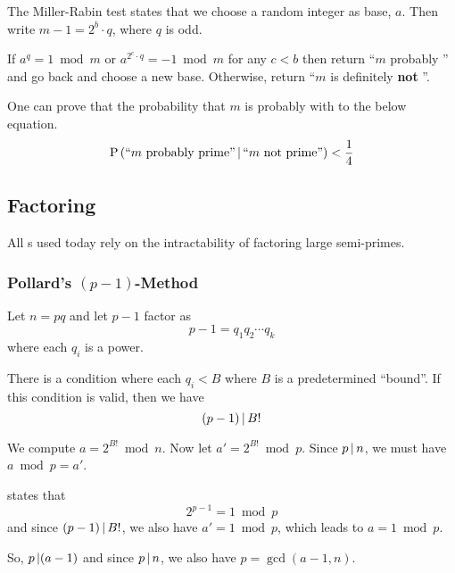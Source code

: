 \begin{theorem}\label{thm:Miller_Rabin_Test}
  The Miller-Rabin test states that we choose a random integer as base, $a$.
  Then write $m -1 = 2^{b} \cdot q$, where $q$ is odd.

  If $a^{q} = 1 \bmod m$ or $a^{2^{c} \cdot q} = -1 \bmod m$ for any $c < b$ then return ``$m$ probably '' and go back and choose a new base.
  Otherwise, return ``$m$ is definitely \textbf{not} ''.

  One can prove that the probability that $m$ is probably  with to the below equation.
  \begin{equation}\label{eq:Miller_Rabin_Test_Success_Probability}
    \operatorname{\operatorname{P}} \left( \text{``$m$ probably prime''} \operatorname{\vert} \text{``$m$ not prime''} \right) < \frac{1}{4}
  \end{equation}
\end{theorem}

\subsection{Factoring}\label{subsec:Factoring}
All s used today rely on the intractability of factoring large semi-primes.

\subsubsection{\texorpdfstring{Pollard's $(p-1)$-Method}{Pollard's Method}}\label{subsubsec:Pollards_Method}
\begin{theorem}\label{thm:Pollards_Method}
  Let $n = pq$ and let $p-1$ factor as
  \begin{equation*}
    p-1 = q_{1}q_{2} \cdots q_{k}
  \end{equation*}
  where each $q_{i}$ is a  power.

  There is a condition where each $q_{i} < B$ where $B$ is a predetermined ``bound''.
  If this condition is valid, then we have
  \begin{equation*}
    (p-1) \operatorname{\vert} B!
  \end{equation*}

  We compute $a = 2^{B!} \bmod n$.
  Now let $a' = 2^{B!} \bmod p$.
  Since $p \operatorname{\vert} n$, we must have $a \bmod p = a'$.

   states that
  \begin{equation*}
    2^{p-1} = 1 \bmod p
  \end{equation*}
  and since $(p-1) \operatorname{\vert} B!$, we also have $a' = 1 \bmod p$, which leads to $a = 1 \bmod p$.

  So, $p \operatorname{\vert} (a-1)$ and since $p \operatorname{\vert} n$, we also have $p = \gcd(a-1, n)$.
\end{theorem}

